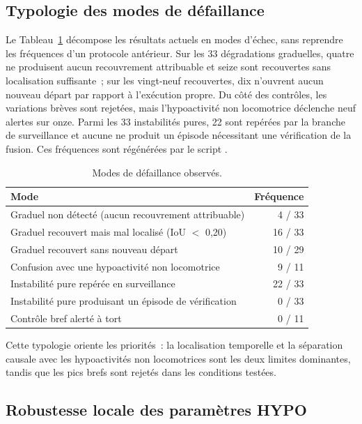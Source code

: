 \subsection{Typologie des modes de défaillance}

Le Tableau~\ref{tab:failure_modes} décompose les résultats actuels en modes d'échec, sans
reprendre les fréquences d'un protocole antérieur. Sur les 33 dégradations graduelles, quatre
ne produisent aucun recouvrement attribuable et seize sont recouvertes sans localisation
suffisante~; sur les vingt-neuf recouvertes, dix n'ouvrent aucun nouveau départ par rapport à
l'exécution propre. Du côté des contrôles, les variations brèves sont rejetées, mais
l'hypoactivité non locomotrice déclenche neuf alertes sur onze. Parmi les 33 instabilités
pures, 22 sont repérées par la branche de surveillance et aucune ne produit un épisode
nécessitant une vérification de la fusion. Ces fréquences sont régénérées par le script
.

\begin{table}[H]
  \centering
  \caption{Modes de défaillance observés.}
  \label{tab:failure_modes}
  \small
  \begin{tabular}{p{}r}
    \toprule
    Mode & Fréquence \\
    \midrule
    Graduel non détecté (aucun recouvrement attribuable) & 4 / 33 \\
    Graduel recouvert mais mal localisé (IoU $<$ 0,20) & 16 / 33 \\
    Graduel recouvert sans nouveau départ & 10 / 29 \\
    Confusion avec une hypoactivité non locomotrice & 9 / 11 \\
    Instabilité pure repérée en surveillance & 22 / 33 \\
    Instabilité pure produisant un épisode de vérification & 0 / 33 \\
    Contrôle bref alerté à tort & 0 / 11 \\
    \bottomrule
  \end{tabular}
\end{table}

Cette typologie oriente les priorités~: la localisation temporelle et la séparation causale
avec les hypoactivités non locomotrices sont les deux limites dominantes, tandis que les pics
brefs sont rejetés dans les conditions testées.

\subsection{Robustesse locale des paramètres HYPO}

